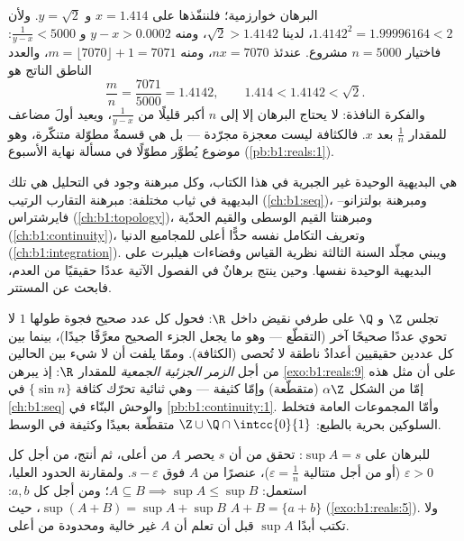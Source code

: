 \begin{example}\label{ex:b1:reals:densityrun}
البرهان خوارزمية؛ فلننفّذها على $x = 1.414$ و
$y = \sqrt 2$. ولأن $1.4142^2 = 1.99996164 < 2$، لدينا $\sqrt 2
> 1.4142$، ومنه $y - x > 0.0002$ و $\frac{1}{y - x} < 5000$: فاختيار
$n = 5000$ مشروع. عندئذ $nx = 7070$، ومنه $m = \lfloor
7070 \rfloor + 1 = 7071$، والعدد الناطق الناتج هو
\[
\frac{m}{n} = \frac{7071}{5000} = 1.4142,
\qquad
1.414 < 1.4142 < \sqrt 2 .
\]
والفكرة النافذة: لا يحتاج البرهان إلا إلى $n$ أكبر قليلًا من
$\frac{1}{y-x}$، ويعيد أولَ مضاعف للمقدار $\frac 1n$
بعد $x$. فالكثافة ليست معجزة مجرّدة --- بل هي قسمةٌ
مطوّلة متنكّرة، وهو موضوع يُطوَّر مطوّلًا في مسألة نهاية
الأسبوع (\cref{pb:b1:reals:1}).
\end{example}

\begin{remark}
 هي البديهية الوحيدة غير الجبرية في هذا
الكتاب، وكل مبرهنة وجود في التحليل هي تلك البديهية
في ثياب مختلفة: مبرهنة التقارب الرتيب
(\cref{ch:b1:seq})، ومبرهنة بولتزانو--فايرشتراس
(\cref{ch:b1:topology})، ومبرهنتا القيم الوسطى والقيم
الحدّية (\cref{ch:b1:continuity})، وتعريف التكامل نفسه
حدًّا أعلى للمجاميع الدنيا (\cref{ch:b1:integration}).
ويبني مجلّد السنة الثالثة نظرية القياس وفضاءات هيلبرت على
البديهية الوحيدة نفسها. وحين ينتج برهانٌ في الفصول الآتية
عددًا حقيقيًا من العدم، فابحث عن  المستتر.
\end{remark}

\begin{remark}
تجلس $\Z$ و $\Q$ على طرفي نقيض داخل $\R$: فحول كل
عدد صحيح فجوة طولها $1$ لا تحوي عددًا صحيحًا آخر
(التقطّع --- وهو ما يجعل الجزء الصحيح معرَّفًا جيدًا)،
بينما بين كل عددين حقيقيين أعدادٌ ناطقة لا تُحصى
(الكثافة). وممّا يلفت أن لا شيء بين الحالين من أجل
\emph{الزمر الجزئية الجمعية} للمقدار $\R$: إذ يبرهن \cref{exo:b1:reals:9} على أن
مثل هذه  إمّا من الشكل $\alpha\Z$ (متقطّعة) وإمّا
كثيفة --- وهي ثنائية تحرّك كثافة $\{\sin n\}$ في
\cref{ch:b1:seq} والوحش البنّاء في
\cref{pb:b1:continuity:1}. وأمّا المجموعات العامة فتخلط
السلوكين بحرية بالطبع:  $\Z \cup \Q\cap\intcc{0}{1}$ متقطّعة بعيدًا
وكثيفة في الوسط.
\end{remark}

\begin{method}\label{met:b1:reals:supproofs}
للبرهان على $\sup A = s$: تحقق من أن $s$ يحصر $A$ من أعلى، ثم أنتج،
من أجل كل $\varepsilon > 0$ (أو من أجل متتالية $\varepsilon = \frac
1n$)، عنصرًا من $A$ فوق $s - \varepsilon$. ولمقارنة الحدود العليا،
استعمل: $A \subseteq B \implies \sup A \leq \sup B$؛ ومن أجل كل $a, b$:
$\sup(A + B) = \sup A + \sup B$، حيث $A + B = \{a + b\}$
(\cref{exo:b1:reals:5}). ولا تكتب أبدًا $\sup A$ قبل أن تعلم أن $A$
غير خالية ومحدودة من أعلى.
\end{method}

